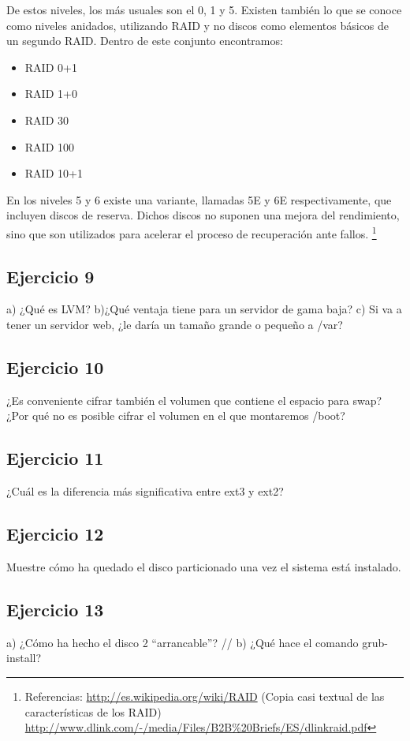 \documentclass[a4paper, 11pt]{article} %
\begin{document}
De estos niveles, los más usuales son el 0, 1 y 5.
Existen también lo que se conoce como niveles anidados, utilizando RAID y no discos como elementos básicos de un segundo RAID. Dentro de este conjunto encontramos: 
\begin{itemize}
\item RAID 0+1
\item RAID 1+0
\item RAID 30
\item RAID 100
\item RAID 10+1
\end{itemize}

En los niveles 5 y 6 existe una variante, llamadas 5E y 6E respectivamente, que incluyen discos de reserva. Dichos discos no suponen una mejora del rendimiento, sino que son utilizados para acelerar el proceso de recuperación ante fallos. 
\footnote{Referencias: \url{http://es.wikipedia.org/wiki/RAID} (Copia casi textual de las características de los RAID) \\ \url{http://www.dlink.com/-/media/Files/B2B\%20Briefs/ES/dlinkraid.pdf}}


\subsection*{Ejercicio 9}
a) ¿Qué es LVM? b)¿Qué ventaja tiene para un servidor de gama baja? c)
Si va a tener un servidor web, ¿le daría un tamaño grande o pequeño a /var?


\subsection*{Ejercicio 10}
¿Es conveniente cifrar también el volumen que contiene el espacio para
swap? ¿Por qué no es posible cifrar el volumen en el que montaremos /boot?


\subsection*{Ejercicio 11}
¿Cuál es la diferencia más significativa entre ext3 y ext2?


\subsection*{Ejercicio 12}
Muestre cómo ha quedado el disco particionado una vez el sistema está
instalado.


\subsection*{Ejercicio 13}
a) ¿Cómo ha hecho el disco 2 “arrancable”? //
b) ¿Qué hace el comando grub-install?
\end{document}
